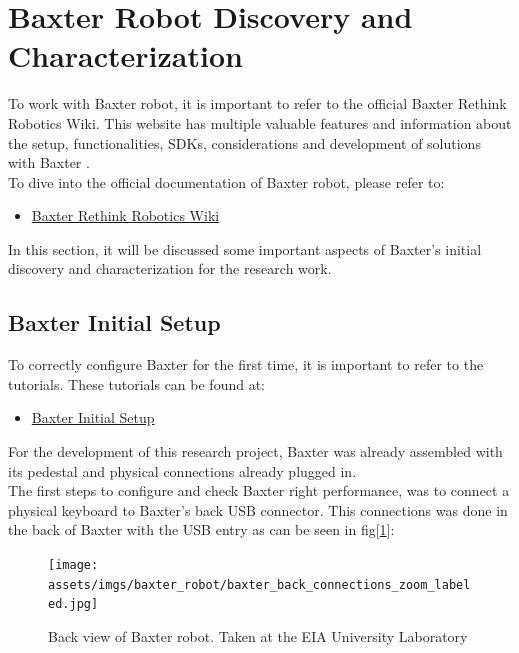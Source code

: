 \documentclass[11pt]{report} %
\begin{document}
\section{Baxter Robot Discovery and Characterization}

To work with Baxter robot, it is important to refer to the official Baxter Rethink Robotics Wiki. This website has multiple valuable features and information about the setup, functionalities, SDKs, considerations and development of solutions with Baxter \citep{cite_baxter_main_wiki}.\\

To dive into the official documentation of Baxter robot, please refer to:

\begin{itemize}
    \color{blue}
    \item \href{https://sdk.rethinkrobotics.com/wiki/Home}{Baxter Rethink Robotics Wiki}
\end{itemize}

In this section, it will be discussed some important aspects of Baxter's initial discovery and characterization for the research work.\\

\subsection{Baxter Initial Setup}

To correctly configure Baxter for the first time, it is important to refer to the  tutorials. These tutorials can be found at:

\begin{itemize}
    \color{blue}
    \item \href{https://sdk.rethinkrobotics.com/wiki/Getting_Started}{Baxter Initial Setup}
\end{itemize}

For the development of this research project, Baxter was already assembled with its pedestal and physical connections already plugged in.\\

The first steps to configure and check Baxter right performance, was to connect a physical keyboard to Baxter's back USB connector. This connections was done in the back of Baxter with the USB entry as can be seen in fig[\ref{fig_baxter_back_part_closeup}]:\\


\begin{figure}[H]
    \centering
    \texttt{[image: assets/imgs/baxter\_robot/baxter\_back\_connections\_zoom\_labeled.jpg]}
    \caption{Back view of Baxter robot. Taken at the EIA University Laboratory} 
    \label{fig_baxter_back_part_closeup}
\end{figure}
\end{document}

